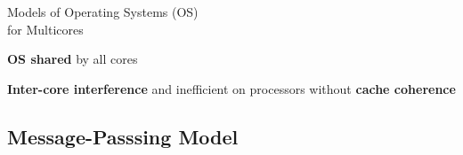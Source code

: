 \begin{frame}[t]{Models of Operating Systems (OS)\\for Multicores}
\begin{overprint}
{				%



				\begin{center}
					\textbf{OS shared} by all cores
				\end{center}
				\begin{center}
					\textbf{Inter-core interference} and inefficient on processors without \textbf{cache coherence}
				\end{center}
			}
		\end{overprint}

		\end{frame}

	\subsection{Message-Passsing Model}

